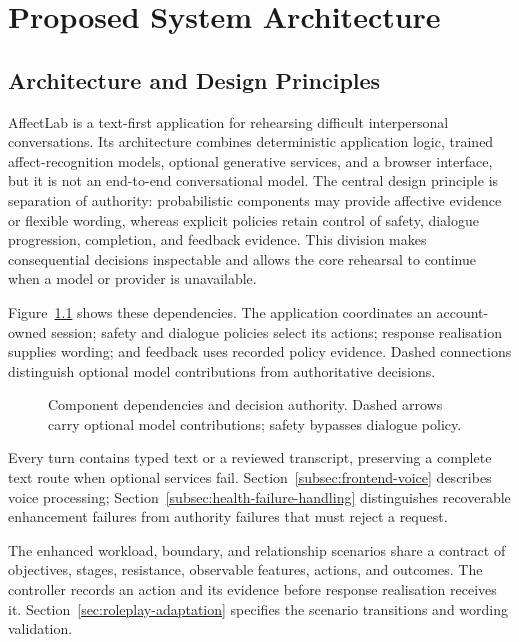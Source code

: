 \chapter{Proposed System Architecture}
\label{chap:proposed-system-architecture}

\section{Architecture and Design Principles}
\label{sec:system-overview}

AffectLab is a text-first application for rehearsing difficult interpersonal conversations. Its architecture combines deterministic application logic, trained affect-recognition models, optional generative services, and a browser interface, but it is not an end-to-end conversational model. The central design principle is separation of authority: probabilistic components may provide affective evidence or flexible wording, whereas explicit policies retain control of safety, dialogue progression, completion, and feedback evidence. This division makes consequential decisions inspectable and allows the core rehearsal to continue when a model or provider is unavailable.

Figure~\ref{fig:system-architecture} shows these dependencies. The application coordinates an account-owned session; safety and dialogue policies select its actions; response realisation supplies wording; and feedback uses recorded policy evidence. Dashed connections distinguish optional model contributions from authoritative decisions.

\begin{figure}[htbp]
\centering

\caption[Component dependencies and decision authority in AffectLab.]{Component dependencies and decision authority. Dashed arrows carry optional model contributions; safety bypasses dialogue policy.}
\label{fig:system-architecture}
\end{figure}

Every turn contains typed text or a reviewed transcript, preserving a complete text route when optional services fail. Section~\ref{subsec:frontend-voice} describes voice processing; Section~\ref{subsec:health-failure-handling} distinguishes recoverable enhancement failures from authority failures that must reject a request.

The enhanced workload, boundary, and relationship scenarios share a contract of objectives, stages, resistance, observable features, actions, and outcomes. The controller records an action and its evidence before response realisation receives it. Section~\ref{sec:roleplay-adaptation} specifies the scenario transitions and wording validation.

